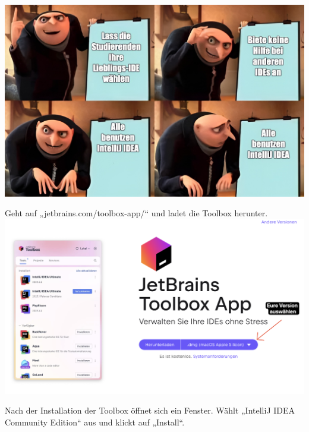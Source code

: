 \documentclass{../sheet}
\begin{document}
\newpage



\includegraphics[width=1\linewidth]{img/memeIDE.jpg}



Geht auf „jetbrains.com/toolbox-app/“ und ladet die Toolbox herunter. \\
\includegraphics[width=1\linewidth]{img/toolBoxDownload.png}

\newpage

Nach der Installation der Toolbox öffnet sich ein
Fenster. Wählt „IntelliJ IDEA
Community Edition“ aus und klickt auf „Install“.\\
\end{document}
